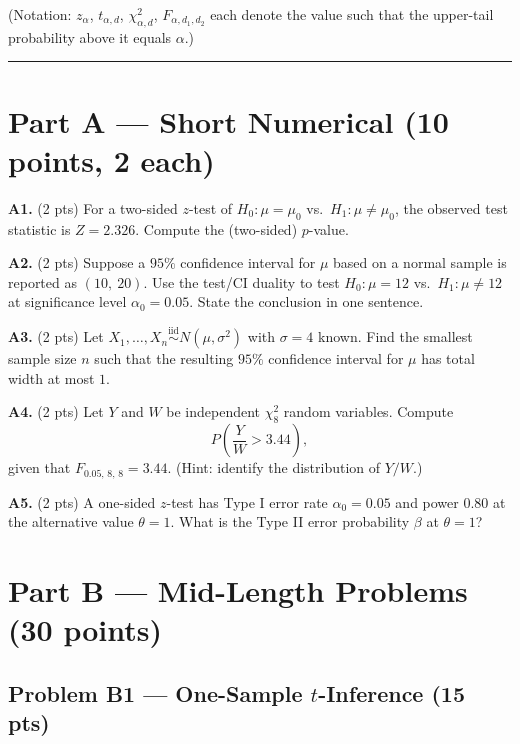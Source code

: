 \documentclass[11pt]{article}
\newcommand{\iid}{\stackrel{\text{iid}}{\sim}}
\begin{document}
(Notation: $z_{\alpha}$, $t_{\alpha, d}$, $\chi^2_{\alpha, d}$, $F_{\alpha, d_1, d_2}$ each denote the value such that the upper-tail probability above it equals $\alpha$.)

\hrule

\section*{Part A --- Short Numerical (10 points, 2 each)}

\textbf{A1.} (2 pts) For a two-sided $z$-test of $H_0: \mu = \mu_0$ vs.\ $H_1: \mu \ne \mu_0$, the observed test statistic is $Z = 2.326$. Compute the (two-sided) $p$-value.

\vspace{0.5em}

\textbf{A2.} (2 pts) Suppose a $95\%$ confidence interval for $\mu$ based on a normal sample is reported as $(10,\ 20)$. Use the test/CI duality to test $H_0: \mu = 12$ vs.\ $H_1: \mu \ne 12$ at significance level $\alpha_0 = 0.05$. State the conclusion in one sentence.

\vspace{0.5em}

\textbf{A3.} (2 pts) Let $X_1, \dots, X_n \iid N(\mu, \sigma^2)$ with $\sigma = 4$ known. Find the smallest sample size $n$ such that the resulting $95\%$ confidence interval for $\mu$ has total width at most $1$.

\vspace{0.5em}

\textbf{A4.} (2 pts) Let $Y$ and $W$ be independent $\chi^2_8$ random variables. Compute
\[
P\!\left(\frac{Y}{W} > 3.44\right),
\]
given that $F_{0.05,\,8,\,8} = 3.44$. (Hint: identify the distribution of $Y/W$.)

\vspace{0.5em}

\textbf{A5.} (2 pts) A one-sided $z$-test has Type I error rate $\alpha_0 = 0.05$ and power $0.80$ at the alternative value $\theta = 1$. What is the Type II error probability $\beta$ at $\theta = 1$?

\section*{Part B --- Mid-Length Problems (30 points)}

\subsection*{Problem B1 --- One-Sample $t$-Inference (15 pts)}
\end{document}
